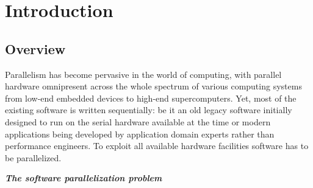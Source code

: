 \chapter{Introduction}
\label{introduction}
\section{Overview}
\label{introduction_overview}
\quad Parallelism has become pervasive in the world of computing, with parallel hardware omnipresent across the whole spectrum of various computing systems from low-end embedded devices to high-end supercomputers. Yet, most of the existing software is written sequentially: be it an old legacy software initially designed to run on the serial hardware available at the time or modern applications being developed by application domain experts rather than performance engineers. To exploit all available hardware facilities software has to be parallelized.
\begin{center}
\textbf{\large \textit{The software parallelization problem}}
\end{center}
